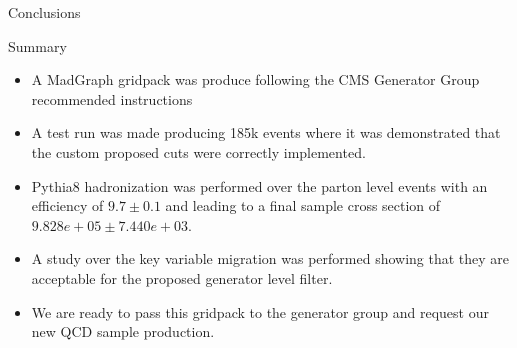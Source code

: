 \documentclass[8pt]{beamer}
\begin{document}
\begin{frame}{Conclusions}

\begin{block}{Summary}
  
\begin{itemize}
  \item A MadGraph gridpack was produce following the CMS Generator Group recommended instructions
  \item A test run was made producing 185k events where it was demonstrated that the custom proposed cuts were correctly implemented.
  \item Pythia8 hadronization was performed over the parton level events with an efficiency of $ 9.7 \pm 0.1$ and leading to a final sample cross section of $9.828e+05 \pm 7.440e+03$.
  \item A study over the key variable migration was performed showing that they are acceptable for the proposed generator level filter.
  \item We are ready to pass this gridpack to the generator group and request our new QCD sample production.
\end{itemize}
  
\end{block}

\end{frame}
\end{document}

